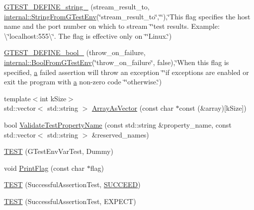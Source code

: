 \begin{DoxyCompactItemize}
\item 
\hyperlink{namespacetesting_a0422a6f971513cf559a8575a0533b235}{G\+T\+E\+S\+T\+\_\+\+D\+E\+F\+I\+N\+E\+\_\+string\+\_\+} (stream\+\_\+result\+\_\+to, \hyperlink{namespacetesting_1_1internal_ac54dabc540bf79c2de91add679bfb93b}{internal\+::\+String\+From\+G\+Test\+Env}(\char`\"{}stream\+\_\+result\+\_\+to\char`\"{},\char`\"{}\char`\"{}),\char`\"{}This flag specifies the host name and the port number on which to stream \char`\"{}\char`\"{}test results. Example\+: \textbackslash{}\char`\"{}localhost\+:555\textbackslash{}\char`\"{}. The flag is effective only on \char`\"{}\char`\"{}Linux.\char`\"{})
\item 
\hyperlink{namespacetesting_a05ff4385edff6d44f6823f5eade7abe2}{G\+T\+E\+S\+T\+\_\+\+D\+E\+F\+I\+N\+E\+\_\+bool\+\_\+} (throw\+\_\+on\+\_\+failure, \hyperlink{namespacetesting_1_1internal_a67132cdce23fb71b6c38ee34ef81eb4c}{internal\+::\+Bool\+From\+G\+Test\+Env}(\char`\"{}throw\+\_\+on\+\_\+failure\char`\"{}, false),\char`\"{}When this flag is specified, \hyperlink{_07copy_08_2_read_camera_model_8m_a551a3d351eadcc0b9b1a2f24f0fb5ea0}{a} failed assertion will throw an exception \char`\"{}\char`\"{}if exceptions are enabled or exit the program with \hyperlink{_07copy_08_2_read_camera_model_8m_a551a3d351eadcc0b9b1a2f24f0fb5ea0}{a} non-\/zero code \char`\"{}\char`\"{}otherwise.\char`\"{})
\item 
{\footnotesize template$<$int k\+Size$>$ }\\std\+::vector$<$ std\+::string $>$ \hyperlink{namespacetesting_a956d4c522454fa6dfd75b5bbbefe8f9e}{Array\+As\+Vector} (const char $\ast$const (\&array)\mbox{[}k\+Size\mbox{]})
\item 
bool \hyperlink{namespacetesting_a4c9bd414747bf0563bfdb32a2307dcdf}{Validate\+Test\+Property\+Name} (const std\+::string \&property\+\_\+name, const std\+::vector$<$ std\+::string $>$ \&reserved\+\_\+names)
\item 
\hyperlink{namespacetesting_af4187d1b48a2812f1335721ed8f30a99}{T\+E\+ST} (G\+Test\+Env\+Var\+Test, Dummy)
\item 
void \hyperlink{namespacetesting_a9863402455bfcf9be5fc0b1453a6d97d}{Print\+Flag} (const char $\ast$flag)
\item 
\hyperlink{namespacetesting_ae0cbea692840c88ab0b03285eb69ac97}{T\+E\+ST} (Successful\+Assertion\+Test, \hyperlink{gtest_8h_a75adcdf89f69b0b615e395daafc315af}{S\+U\+C\+C\+E\+ED})
\item 
\hyperlink{namespacetesting_af6c8f998f934372e5687d3998068e5e4}{T\+E\+ST} (Successful\+Assertion\+Test, E\+X\+P\+E\+CT)

\end{DoxyCompactItemize}
